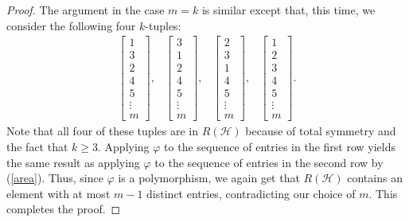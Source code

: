 \documentclass[11 pt]{amsart}
\theoremstyle{definition}
\theoremstyle{case}
\numberwithin{equation}{section}
\begin{document}
\begin{proof}
The argument in the case $m=k$ is similar except that, this time, we consider the following four $k$-tuples:
\[\begin{array}{cccc}\begin{bmatrix}
           1 \\
           3 \\
           2 \\
           4 \\
           5\\
           \vdots \\
           m
         \end{bmatrix}  ,       
&         
         \begin{bmatrix}
           3 \\
           1 \\
           2 \\
           4\\
           5\\
           \vdots \\
           m
         \end{bmatrix}  ,       
&         
         \begin{bmatrix}
           2 \\
           3 \\
           1 \\
           4\\
           5\\
           \vdots \\
           m
         \end{bmatrix}  ,       
&         
         \begin{bmatrix}
           1 \\
           2 \\
           3 \\
           4\\
           5\\
           \vdots \\
           m
         \end{bmatrix} .
         \end{array}
         \]
Note that all four of these tuples are in $R(\mathcal{H})$ because of total symmetry and the fact that $k\geq3$. Applying $\varphi$ to the sequence of entries in the first row yields the same result as applying $\varphi$ to the sequence of entries in the second row by (\ref{area}). Thus, since $\varphi$ is a polymorphism, we again get that $R(\mathcal{H})$ contains an element with at most $m-1$ distinct entries, contradicting our choice of $m$. This completes the proof. 
\end{proof}
\end{document}
